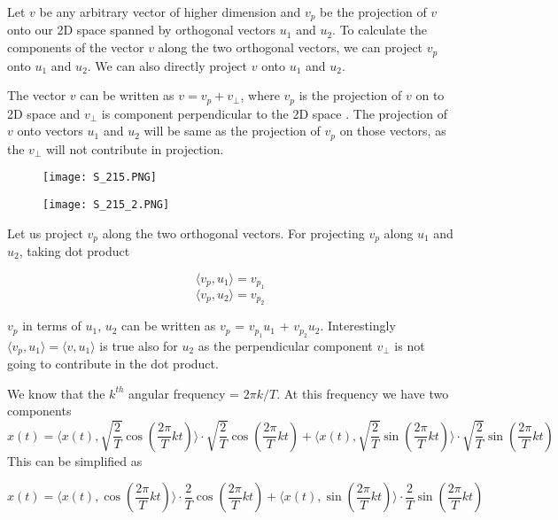 \noindent
 Let $v$ be any arbitrary vector of higher dimension and $v_p$ be the projection of $v$ onto our 2D space spanned by orthogonal vectors $u_1$ and $u_2$. To calculate the components of the vector $v$ along the two orthogonal vectors, we can project $v_p$  onto $u_1$ and $u_2$. We can also directly project $v$ onto $u_1$ and $u_2$.
 


\noindent
 The vector $v$ can be written as $v = v_p  + v_\perp$, where $v_p$ is the projection of $v$ on to 2D space and $v_\perp$ is component perpendicular to the 2D space . The projection of $v$ onto vectors $u_1$ and $u_2$ will be same as the projection of $v_p$  on those vectors, as the $v_\perp$ will not contribute in projection.
 
\begin{figure}[h!]
\centering
\texttt{[image: S\_215.PNG]}		
\end{figure}

 \begin{figure}[h!]
\centering
\texttt{[image: S\_215\_2.PNG]}		
\end{figure}

\noindent
Let us project $v_p$ along the two orthogonal vectors. 
  For projecting  $v_p$  along $u_1$ and $u_2$, taking dot product 
 
\begin{equation*} \langle v_p, u_1 \rangle =v_{p_1} \end{equation*}
\begin{equation*} \langle v_p, u_2 \rangle = v_{p_2} \end{equation*}
 
\noindent
$v_p$  in terms of $u_1$, $u_2$ can be written as $v_p$  = $v_{p_1}u_1$ + $v_{p_2}u_2$. Interestingly  $\langle v_p, u_1 \rangle = \langle v, u_1 \rangle$ is true also for $u_2$ as the perpendicular component $v_\perp$ is not going to contribute in the dot product. 
        
We know that the $k^{th}$ angular frequency =  $2 \pi k/T$.
At this frequency we have two components 
\begin{equation*}x(t) = \langle x(t), \sqrt{\frac{2}{T}}\cos (\frac{2\pi}{T}kt)\rangle \cdot \sqrt{\frac{2}{T}}\cos (\frac{2\pi}{T}kt) + \langle x(t), \sqrt{\frac{2}{T}}\sin (\frac{2\pi}{T}kt)\rangle \cdot \sqrt{\frac{2}{T}}\sin (\frac{2\pi}{T}kt)\end{equation*}
This can be simplified as

\begin{equation*}x(t) = \langle x(t), \cos (\frac{2\pi}{T}kt)\rangle \cdot \frac{2}{T}\cos (\frac{2\pi}{T}kt) + \langle x(t), \sin (\frac{2\pi}{T}kt)\rangle \cdot \frac{2}{T}\sin (\frac{2\pi}{T}kt)\end{equation*}

